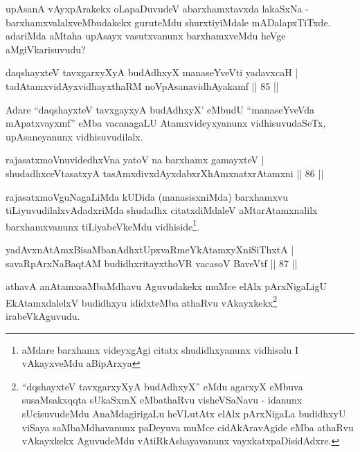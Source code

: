 \begin{artha}
upAsanA vAyxpArakekx oLapaDuvudeV abarxhamxtavxda lakaSxNa - barxhamxvalalxveMbudakekx guruteMdu shurxtiyiMdale mADalapxTiTxde. adariMda aMtaha upAsayx vasutxvanunx barxhamxveMdu heVge aMgiVkarisuvudu?
\end{artha}

\begin{shl}
daqshayxteV tavxgarxyXyA budAdhxyX manaseYveVti yadavxcaH |\\
tadAtamxvidAyxvidhayxthaRM noVpAsanavidhAyakamf \hfill || 85 ||
\end{shl}

\begin{artha}
Adare ``daqshayxteV tavxgayxyA budAdhxyX' eMbudU ``manaseYveVda mApatxvayxmf'' eMba vacanagaLU Atamxvideyxyanunx vidhisuvudaSeTx, upAsaneyanunx vidhisuvudilalx.
\end{artha}

\begin{shl}
rajasatxmoVnuvidedhxVna yatoV na barxhamx gamayxteV |\\
shudadhxceVtasatxyA tasAmxdivxdAyxdabxrXhAmxnatxrAtamxni \hfill || 86 ||
\end{shl}

\begin{artha}
rajasatxmoVguNagaLiMda kUDida (manasisxniMda) barxhamxvu tiLiyuvudilalxvAdadxriMda shudadhx citatxdiMdaleV aMtarAtamxnalilx barxhamxvanunx tiLiyabeVkeMdu  vidhiside\footnote{aMdare barxhamx   videyxgAgi citatx shudidhxyanunx vidhisalu I vAkayxveMdu aBipArxya}.
\end{artha}

\begin{shl}
yadAvx\s nAtAmxBisaMbanAdhxtUpxvaRmeYkAtamxyXniSiThxtA |\\
savaRpArxNaBaqtAM budidhxritayxthoVR vacasoV BaveVtf \hfill || 87 ||
\end{shl}

\begin{artha}
athavA anAtamxsaMbaMdhavu Aguvudakekx muMce elAlx pArxNigaLigU
EkAtamxdalelxV budidhxyu ididxteMba athaRvu
vAkayxkekx\footnote{``dqshayxteV tavxgarxyXyA budAdhxyX'' eMdu agarxyX eMbuva susaMsakxqqta
  sUkaSxmX eMbathaRvu visheVSaNavu - idanunx sUcisuvudeMdu
  AnaMdagirigaLu heVLutAtx elAlx pArxNigaLa budidhxyU viSaya
  saMbaMdhavanunx paDeyuva muMce cidAkAravAgide eMba athaRvu
  vAkayxkekx AguvudeMdu vAtiRkAshayavanunx vayxkatxpaDisidAdxre.} irabeVkAguvudu.
\end{artha}


